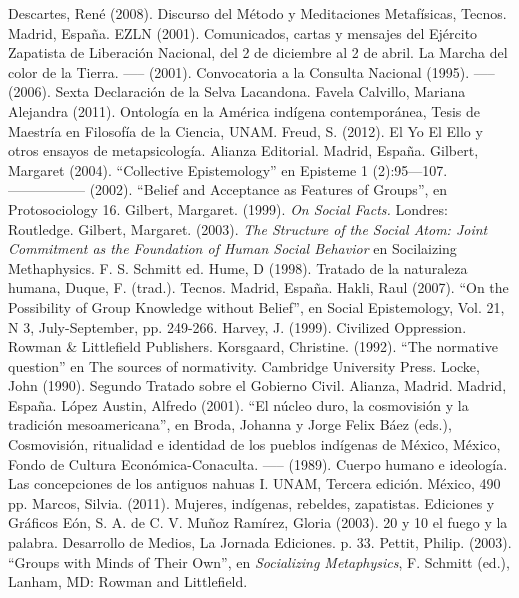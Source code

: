 \documentclass[oneside]{book}
\begin{document}
\begin{thebibliography}{99}
 Descartes, René (2008). Discurso del Método y Meditaciones Metafísicas, Tecnos. Madrid, España.
 EZLN (2001). Comunicados, cartas y mensajes del Ejército Zapatista de Liberación Nacional, del 2 de diciembre al 2 de abril. La Marcha del color de la Tierra.
 ----- (2001). Convocatoria a la Consulta Nacional (1995).
 ----- (2006). Sexta Declaración de la Selva Lacandona.
 Favela Calvillo, Mariana Alejandra (2011). Ontología en la América indígena contemporánea, Tesis de Maestría en Filosofía de la Ciencia,  UNAM.
 Freud, S. (2012). El Yo El Ello y otros ensayos de metapsicología. Alianza Editorial. Madrid, España.
 Gilbert, Margaret (2004). “Collective Epistemology” en Episteme 1 (2):95—107.
 ----------------- (2002). “Belief and Acceptance as Features of Groups”, en Protosociology 16.   
 Gilbert, Margaret. (1999). \textit{On Social Facts.} Londres: Routledge.
 Gilbert, Margaret. (2003). \textit{The Structure of the Social Atom: Joint Commitment as the Foundation of Human Social Behavior} en Socilaizing Methaphysics. F. S. Schmitt ed.
 Hume, D (1998). Tratado de la naturaleza humana, Duque, F. (trad.). Tecnos. Madrid, España.
 Hakli, Raul (2007). “On the Possibility of Group Knowledge without Belief”, en Social Epistemology, Vol. 21, N 3, July-September, pp. 249-266.  
 Harvey, J. (1999). Civilized Oppression. Rowman \& Littlefield Publishers.
 Korsgaard, Christine. (1992). “The normative question” en The sources of normativity. Cambridge University Press.
 Locke, John (1990). Segundo Tratado sobre el Gobierno Civil. Alianza, Madrid. Madrid, España.
 López Austin, Alfredo (2001). “El núcleo duro, la cosmovisión y la tradición mesoamericana”, en Broda, Johanna y Jorge Felix Báez (eds.), Cosmovisión, ritualidad e identidad de los pueblos indígenas de México, México, Fondo de Cultura Económica-Conaculta.
----- (1989). Cuerpo humano e ideología. Las concepciones de los antiguos nahuas I. UNAM, Tercera edición. México, 490 pp.
 Marcos, Silvia. (2011). Mujeres, indígenas, rebeldes, zapatistas. Ediciones y Gráficos Eón, S. A. de C. V.
 Muñoz Ramírez, Gloria (2003). 20 y 10 el fuego y la palabra. Desarrollo de Medios, La Jornada Ediciones. p. 33.
 Pettit, Philip. (2003). “Groups with Minds of Their Own”, en \textit{Socializing Metaphysics}, F. Schmitt (ed.), Lanham, MD: Rowman and Littlefield.

\end{thebibliography}
\end{document}
